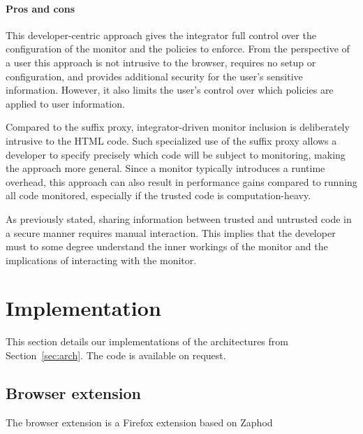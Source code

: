 \documentclass{llncs}
\newcommand{\todo}[1]{\colorbox{red}{\textcolor{white}{\sffamily\bfseries\scriptsize TODO}} \textcolor{red}{#1} \textcolor{red}{$\blacktriangleleft$}}
\begin{document}
\paragraph{Pros and cons}

This developer-centric approach gives the integrator full control over the 
configuration of the monitor and the policies to enforce. From the perspective of a user this 
approach is not intrusive to the browser, requires no setup or configuration, 
and provides additional security for the user's sensitive information. However, 
it also limits the user's control over which policies are applied to user information. 

Compared to the suffix proxy, integrator-driven monitor 
inclusion is deliberately intrusive to the HTML code. Such specialized use of the suffix 
proxy allows a developer to specify precisely which code will be subject to 
monitoring, making the approach more general. 
Since a monitor typically introduces a runtime overhead, this approach can also 
result in performance gains compared to running all code monitored, especially 
if the trusted code is computation-heavy.

As previously stated, sharing information 
between trusted and untrusted code in a secure manner requires manual interaction. 
This implies that the developer must to some degree understand the inner workings of the monitor
and the implications of interacting with the monitor.


\section{Implementation}
\label{sec:impl}

This section details our implementations of the architectures
from Section~\ref{sec:arch}. The code is available on request.


\subsection{Browser extension}

The browser extension is a Firefox extension based on Zaphod~\cite{Zaphod}
\end{document}

